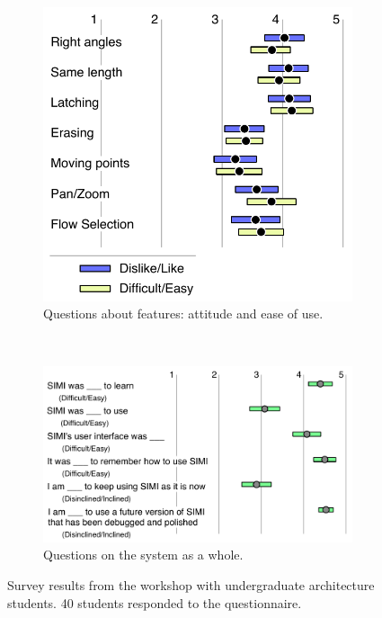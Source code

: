 \begin{figure}
  \centering
  \begin{subfigure}[t]{0.6\textwidth}
    \includegraphics[width=\linewidth]{img/feature-attitude-and-ease.pdf}
    \caption{Questions about features: attitude and ease of use.}
    \label{fig:survey-feature-ease-attitude}
  \end{subfigure}
  \\
  \vspace{5mm}
  \begin{subfigure}[t]{0.8\textwidth}
    \includegraphics[width=\linewidth]{img/program-attitude-2.pdf}
    \caption{Questions on the system as a whole.}
    \label{fig:survey-program-attitude}
  \end{subfigure}
  \caption[Workshop Survey Results]{Survey results from the workshop
    with undergraduate architecture students. 40 students responded to
    the questionnaire.}
  \label{fig:survey}
\end{figure}
